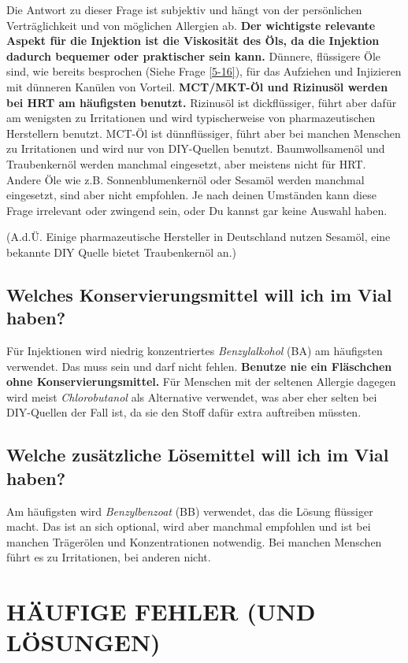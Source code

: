 \documentclass{article}
\begin{document}
{{Die Antwort zu dieser Frage ist subjektiv und hängt von der persönlichen Verträglichkeit und von möglichen Allergien ab. \textbf{Der wichtigste relevante Aspekt für die Injektion ist die Viskosität des Öls, da die Injektion dadurch bequemer oder praktischer sein kann.} Dünnere, flüssigere Öle sind, wie bereits besprochen (Siehe Frage \ref{5-16}), für das Aufziehen und Injizieren mit dünneren Kanülen von Vorteil. \textbf{MCT/MKT-Öl und Rizinusöl werden bei HRT am häufigsten benutzt. }Rizinusöl ist dickflüssiger, führt aber dafür am wenigsten zu Irritationen und wird typischerweise von pharmazeutischen Herstellern benutzt. MCT-Öl ist dünnflüssiger, führt aber bei manchen Menschen zu Irritationen und wird nur von DIY-Quellen benutzt. Baumwollsamenöl und Traubenkernöl werden manchmal eingesetzt, aber meistens nicht für HRT. Andere Öle wie z.B. Sonnenblumenkernöl oder Sesamöl werden manchmal eingesetzt, sind aber nicht empfohlen. Je nach deinen Umständen kann diese Frage irrelevant oder zwingend sein, oder Du kannst gar keine Auswahl haben. 

(A.d.Ü. Einige pharmazeutische Hersteller in Deutschland nutzen Sesamöl, eine bekannte DIY Quelle bietet Traubenkernöl an.)

\subsection{Welches Konservierungsmittel will ich im Vial haben?}\label{6-17}

Für Injektionen wird niedrig konzentriertes \textit{Benzylalkohol} (BA) am häufigsten verwendet. Das muss sein und darf nicht fehlen. \textbf{Benutze nie ein Fläschchen ohne Konservierungsmittel. }Für Menschen mit der seltenen Allergie dagegen wird meist \textit{Chlorobutanol }als Alternative verwendet, was aber eher selten bei DIY-Quellen der Fall ist, da sie den Stoff dafür extra auftreiben müssten.

\subsection{Welche zusätzliche Lösemittel will ich im Vial haben?}

Am häufigsten wird \textit{Benzylbenzoat} (BB) verwendet,  das die Lösung flüssiger macht. Das ist an sich optional, wird aber manchmal empfohlen und ist bei manchen Trägerölen und Konzentrationen notwendig. Bei manchen Menschen führt es zu Irritationen, bei anderen nicht. 
 

\section{HÄUFIGE FEHLER (UND LÖSUNGEN)}

}}
\end{document}
